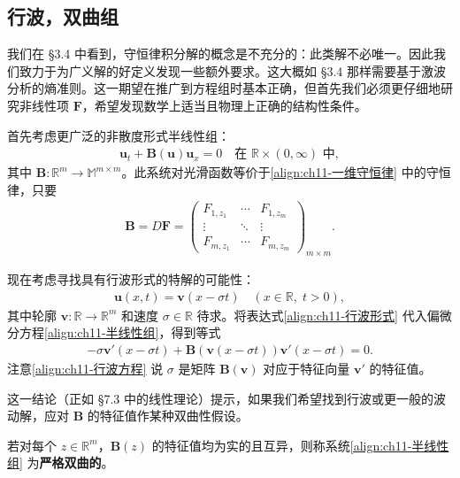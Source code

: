 \documentclass[../../main.tex]{subfiles}
\begin{document}
\subsection{行波，双曲组}\label{subsection:ch11-行波双曲组}

我们在 \S3.4 中看到，守恒律积分解的概念是不充分的：此类解不必唯一。因此我们致力于为广义解的好定义发现一些额外要求。这大概如 \S3.4 那样需要基于激波分析的熵准则。这一期望在推广到方程组时基本正确，但首先我们必须更仔细地研究非线性项 $\mathbf{F}$，希望发现数学上适当且物理上正确的结构性条件。

首先考虑更广泛的非散度形式半线性组：
\begin{align}
\mathbf{u}_t+\mathbf{B}(\mathbf{u})\mathbf{u}_x=0 \quad \text{在 } \mathbb{R}\times(0,\infty) \text{ 中},
\label{align:ch11-半线性组}
\end{align}
其中 $\mathbf{B}:\mathbb{R}^m\to\mathbb{M}^{m\times m}$。此系统对光滑函数等价于\eqref{align:ch11-一维守恒律} 中的守恒律，只要
\begin{align*}
\mathbf{B}=D\mathbf{F}=\begin{pmatrix}
F_{1,z_1} & \cdots & F_{1,z_m}\\
\vdots & \ddots & \vdots\\
F_{m,z_1} & \cdots & F_{m,z_m}
\end{pmatrix}_{m\times m}.
\end{align*}

现在考虑寻找具有行波形式的特解的可能性：
\begin{align}
\mathbf{u}(x,t)=\mathbf{v}(x-\sigma t) \quad (x\in\mathbb{R},\;t>0),
\label{align:ch11-行波形式}
\end{align}
其中轮廓 $\mathbf{v}:\mathbb{R}\to\mathbb{R}^m$ 和速度 $\sigma\in\mathbb{R}$ 待求。将表达式\eqref{align:ch11-行波形式} 代入偏微分方程\eqref{align:ch11-半线性组}，得到等式
\begin{align}
-\sigma\mathbf{v}'(x-\sigma t)+\mathbf{B}(\mathbf{v}(x-\sigma t))\mathbf{v}'(x-\sigma t)=0.
\label{align:ch11-行波方程}
\end{align}
注意\eqref{align:ch11-行波方程} 说 $\sigma$ 是矩阵 $\mathbf{B}(\mathbf{v})$ 对应于特征向量 $\mathbf{v}'$ 的特征值。

这一结论（正如 \S7.3 中的线性理论）提示，如果我们希望找到行波或更一般的波动解，应对 $\mathbf{B}$ 的特征值作某种双曲性假设。

\begin{definition}\label{definition:ch11-严格双曲}
若对每个 $z\in\mathbb{R}^m$，$\mathbf{B}(z)$ 的特征值均为实的且互异，则称系统\eqref{align:ch11-半线性组} 为\textbf{严格双曲的}。
\end{definition}
\end{document}
